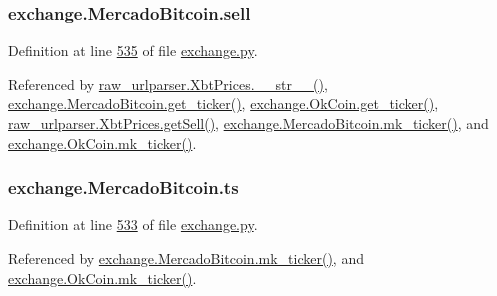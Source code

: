 \subsubsection[{\texorpdfstring{sell}{sell}}]{\setlength{\rightskip}{0pt plus 5cm}exchange.\+Mercado\+Bitcoin.\+sell}\hypertarget{classexchange_1_1_mercado_bitcoin_a9982c7a3f6103c88c64160a5854c35cd}{}\label{classexchange_1_1_mercado_bitcoin_a9982c7a3f6103c88c64160a5854c35cd}


Definition at line \hyperlink{exchange_8py_source_l00535}{535} of file \hyperlink{exchange_8py_source}{exchange.\+py}.



Referenced by \hyperlink{raw__urlparser_8py_source_l00074}{raw\+\_\+urlparser.\+Xbt\+Prices.\+\_\+\+\_\+str\+\_\+\+\_\+()}, \hyperlink{exchange_8py_source_l00543}{exchange.\+Mercado\+Bitcoin.\+get\+\_\+ticker()}, \hyperlink{exchange_8py_source_l00608}{exchange.\+Ok\+Coin.\+get\+\_\+ticker()}, \hyperlink{raw__urlparser_8py_source_l00065}{raw\+\_\+urlparser.\+Xbt\+Prices.\+get\+Sell()}, \hyperlink{exchange_8py_source_l00557}{exchange.\+Mercado\+Bitcoin.\+mk\+\_\+ticker()}, and \hyperlink{exchange_8py_source_l00622}{exchange.\+Ok\+Coin.\+mk\+\_\+ticker()}.

\subsubsection[{\texorpdfstring{ts}{ts}}]{\setlength{\rightskip}{0pt plus 5cm}exchange.\+Mercado\+Bitcoin.\+ts}\hypertarget{classexchange_1_1_mercado_bitcoin_ac4630b08e08f9eeb9dad838dc9dc0cda}{}\label{classexchange_1_1_mercado_bitcoin_ac4630b08e08f9eeb9dad838dc9dc0cda}


Definition at line \hyperlink{exchange_8py_source_l00533}{533} of file \hyperlink{exchange_8py_source}{exchange.\+py}.



Referenced by \hyperlink{exchange_8py_source_l00557}{exchange.\+Mercado\+Bitcoin.\+mk\+\_\+ticker()}, and \hyperlink{exchange_8py_source_l00622}{exchange.\+Ok\+Coin.\+mk\+\_\+ticker()}.

